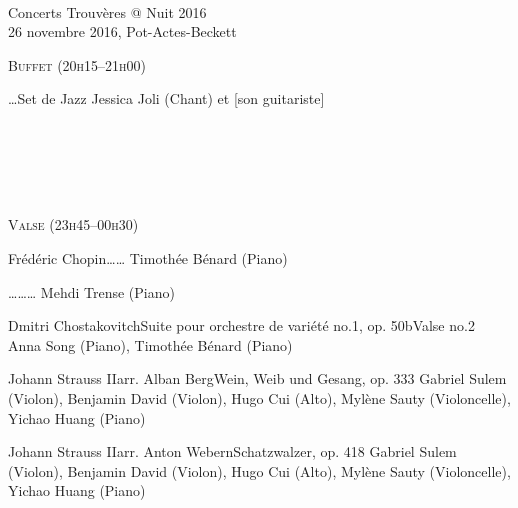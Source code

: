 \documentclass[a4paper,11pt,poets,durations]{ConcProg}
\begin{document}
{
\selectfont

~\\

\begin{programme}{
    Concerts Trouvères @ Nuit 2016
\\  {\normalsize 26 novembre 2016, Pot-Actes-Beckett}
}
~\\
\begin{center}
\textsc{Buffet (20h15--21h00)}
\end{center}
  \begin{part}[]
    \begin{composition}{\dots}{}{Set de Jazz}{}
      {\small Jessica Joli (Chant) et [son guitariste]}
    \end{composition}\\
~\\
~\\
~\\
\begin{center}
\textsc{Valse (23h45--00h30)}
\end{center}
    \begin{composition}{Frédéric Chopin}{}{\dots}{\dots}
      {\small Timothée Bénard (Piano)}
    \end{composition}
    \begin{composition}{\dots}{}{\dots}{\dots}
      {\small Mehdi Trense (Piano)}
    \end{composition}
    \begin{composition}{Dmitri Chostakovitch}{}{Suite pour orchestre de variété no.1, op. 50b}{Valse no.2}
      {\small Anna Song (Piano), Timothée Bénard (Piano)}
    \end{composition}
    \begin{composition}{Johann Strauss II}{arr. Alban Berg}{Wein, Weib und Gesang, op. 333}{}
      {\small Gabriel Sulem (Violon), Benjamin David (Violon), Hugo Cui (Alto), Mylène Sauty (Violoncelle), Yichao Huang (Piano)}
    \end{composition}
    \begin{composition}{Johann Strauss II}{arr. Anton Webern}{Schatzwalzer, op. 418}{}
      {\small Gabriel Sulem (Violon), Benjamin David (Violon), Hugo Cui (Alto), Mylène Sauty (Violoncelle), Yichao Huang (Piano)}
    \end{composition}\\
~\\
~\\
~\\
\begin{center}

\end{center}
\end{part}
\end{programme}}
\end{document}
